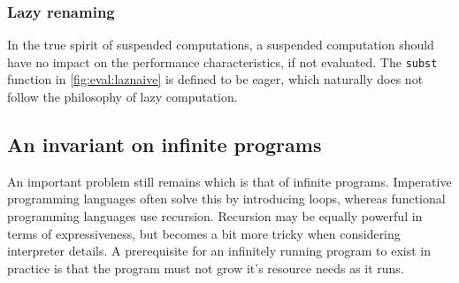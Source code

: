   

\subsubsection{Lazy renaming}
In the true spirit of suspended computations, a suspended computation should have no impact on the performance characteristics, if not evaluated.
The \texttt{subst} function in \autoref{fig:eval:laznaive} is defined to be eager, which naturally does not follow the philosophy of lazy computation. 


\subsection{An invariant on infinite programs}\label{subsec:inf}
An important problem still remains which is that of infinite programs.
Imperative programming languages often solve this by introducing loops, whereas functional programming languages use recursion.
Recursion may be equally powerful in terms of expressiveness, but becomes a bit more tricky when considering interpreter details.
A prerequisite for an infinitely running program to exist in practice is that the program must not grow it's resource needs as it runs.

